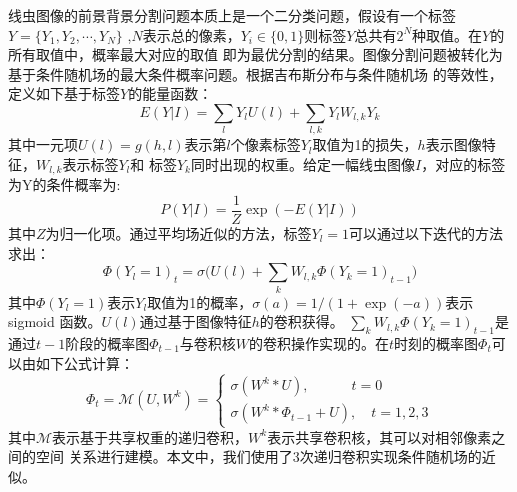 	线虫图像的前景背景分割问题本质上是一个二分类问题，假设有一个标签$Y=\{Y_1,Y_2,\cdots,Y_N\}$
	,$N$表示总的像素，$Y_i\in\{0,1\}$则标签$Y$总共有$2^N$种取值。在$Y$的所有取值中，概率最大对应的取值
	即为最优分割的结果。图像分割问题被转化为基于条件随机场的最大条件概率问题。根据吉布斯分布与条件随机场
	的等效性\cite{Lafferty2001Conditional}，定义如下基于标签$Y$的能量函数：
	\begin{equation}
		E(Y|I) = \sum_{l}Y_lU(l)+\sum_{l,k}Y_lW_{l,k}Y_k
	\end{equation}
	其中一元项$U(l)=g(h,l)$表示第$l$个像素标签$Y_l$取值为1的损失，$h$表示图像特征，$W_{l,k}$表示标签$Y_l$和
	标签$Y_k$同时出现的权重。给定一幅线虫图像$I$，对应的标签为Y的条件概率为:
	\begin{equation}
		P(Y|I)=\frac{1}{Z}\exp(-E(Y|I))
	\end{equation}
	其中$Z$为归一化项。通过平均场近似\cite{zheng2015conditional}的方法，标签$Y_l=1$可以通过以下迭代的方法求出：
	\begin{equation}
		\Phi(Y_l=1)_t=\sigma\Big(U(l)+\sum_{k}W_{l,k}\Phi(Y_k=1)_{t-1}\Big)
	\end{equation}
	其中$\Phi(Y_l=1)$表示$Y_l$取值为1的概率，$\sigma(a)=1/(1+\exp(-a))$表示 sigmoid 函数。$U(l)$通过基于图像特征$h$的卷积获得。
	$\sum_{k}W_{l,k}\Phi(Y_k=1)_{t-1}$是通过$t-1$阶段的概率图$\Phi_{t-1}$与卷积核$W$的卷积操作实现的。在$t$时刻的概率图$\Phi_t$可以由如下公式计算：
	\begin{equation}
		\Phi_t=\mathscr{M}(U,W^k)=\begin{cases}
						\sigma(W^k*U), \quad \quad \quad t=0\\
						\sigma(W^k*\Phi_{t-1}+U), \quad t=1,2,3
						\end{cases}
	\end{equation}
	其中$\mathscr{M}$表示基于共享权重的递归卷积，$W^k$表示共享卷积核，其可以对相邻像素之间的空间
	关系进行建模。本文中，我们使用了3次递归卷积实现条件随机场的近似。
	
	
